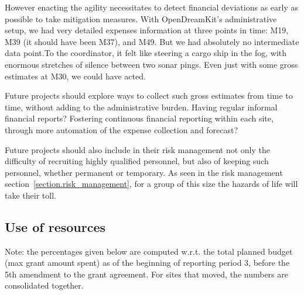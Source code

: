 However enacting the agility necessitates to detect financial
deviations as early as possible to take mitigation measures. With
OpenDreamKit's administrative setup, we had very detailed expenses
information at three points in time: M19, M39 (it should have been
M37), and M49. But we had absolutely no intermediate data point.To the  
coordinator, it felt like steering a cargo ship in the fog, with
enormous stretches of silence between two sonar pings. Even just with
some gross estimates at M30, we could have acted.

Future projects should explore ways to collect such gross estimates
from time to time, without adding to the administrative burden. Having
regular informal financial reports? Fostering continuous financial
reporting within each site, through more automation of the expense
collection and forecast?

Future projects should also include in their risk management not only
the difficulty of recruiting highly qualified personnel, but also of
keeping such personnel, whether permanent or temporary. As seen in the
risk management section~\ref{section.risk_management}, for a group of this size
the hazards of life will take their toll.

\subsection{Use of resources}

Note: the percentages given below are computed w.r.t. the total
planned budget (max grant amount spent) as of the beginning of
reporting period 3, before the 5th amendment to the grant agreement.
For sites that moved, the numbers are consolidated together.

